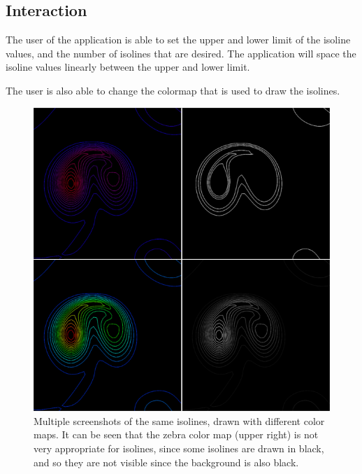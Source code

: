 \subsection{Interaction}
The user of the application is able to set the upper and lower limit of the isoline values, and the number of isolines that are desired.
The application will space the isoline values linearly between the upper and lower limit.

The user is also able to change the colormap that is used to draw the isolines.

\begin{figure}[htb]
  \centering
  \includegraphics[width=\linewidth]{./content/pictures/isolines.png}
  \caption{Multiple screenshots of the same isolines, drawn with different color maps. It can be seen that the zebra color map (upper right) is not very appropriate for isolines, since some isolines are drawn in black, and so they are not visible since the background is also black.}
\end{figure}
\clearpage